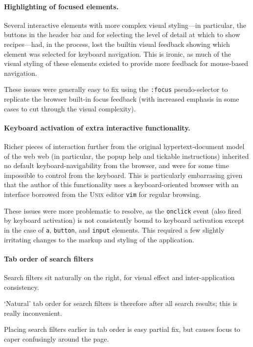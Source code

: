\paragraph{Highlighting of focused elements.}
Several interactive elements with more complex visual styling---in
particular, the buttons in the header bar and for selecting the level
of detail at which to show recipes---had, in the process, lost the
builtin visual feedback showing which element was selected for
keyboard navigation. This is ironic, as much of the visual styling of
these elements existed to provide more feedback for mouse-based
navigation.

These issues were generally easy to fix using the \verb!:focus!
  pseudo-selector to replicate the browser built-in focus feedback
  (with increased emphasis in some cases to cut through the visual
  complexity).

\paragraph{Keyboard activation of extra interactive functionality.}
Richer pieces of interaction further from the original
hypertext-document model of the web web (in particular, the popup help
and tickable instructions) inherited no default keyboard-navigability
from the browser, and were for some time impossible to control from
the keyboard. This is particularly embarrasing given that the author
of this functionality uses a keyboard-oriented browser with an
interface borrowed from the \textsc{Unix} editor \verb!vim! for
regular browsing.

These issues were more problematic to resolve, as the \verb!onclick!
  event (also fired by keyboard activation) is not consistently bound
  to keyboard activation except in the case of \verb!a!,
  \verb!button!, and \verb!input! elements. This required a few
  slightly irritating changes to the markup and styling of the
  application.

\paragraph{Tab order of search filters}

Search filters sit naturally on the right, for visual effect and
inter-application consistency.

`Natural' tab order for search filters is therefore after all search
results; this is really inconvenient.

Placing search filters earlier in tab order is easy partial fix, but
causes focus to caper confusingly around the page.

